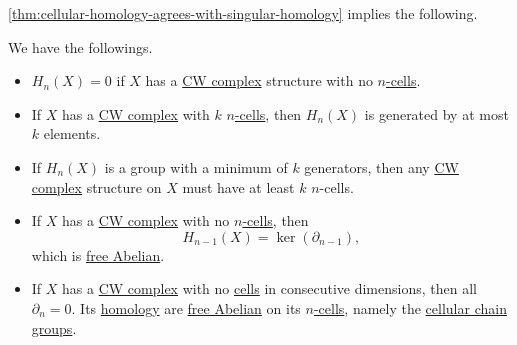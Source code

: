 \autoref{thm:cellular-homology-agrees-with-singular-homology} implies the following.
\begin{corollary}\label{col:lec32}
	We have the followings.
	\begin{itemize}
		\item \(H_n(X) = 0\) if \(X\) has a \hyperref[def:CW-Complex]{CW complex} structure with no \hyperref[def:cell]{\(n\)-cells}.
		\item If \(X\) has a \hyperref[def:CW-Complex]{CW complex} with \(k\) \hyperref[def:cell]{\(n\)-cells}, then \(H_n(X)\) is generated by at most \(k\) elements.
		\item If \(H_n(X)\) is a group with a minimum of \(k\) generators, then any \hyperref[def:CW-Complex]{CW complex} structure on \(X\) must have at least \(k\) \(n\)-cells.
		\item If \(X\) has a \hyperref[def:CW-Complex]{CW complex} with no \hyperref[def:cell]{\(n\)-cells}, then
		      \[
			      H_{n-1}(X) = \ker (\partial _{n-1}),
		      \]
		      which is \hyperref[def:free-Abelian-group]{free Abelian}.
		\item If \(X\) has a \hyperref[def:CW-Complex]{CW complex} with no \hyperref[def:cell]{cells} in consecutive dimensions, then all \(\partial _n=0\).
		      Its \hyperref[def:cellular-homology-group]{homology} are \hyperref[def:free-Abelian-group]{free Abelian} on its \hyperref[def:cell]{\(n\)-cells},
		      namely the \hyperref[def:cellular-chain-complex]{cellular chain groups}.
	\end{itemize}
\end{corollary}
